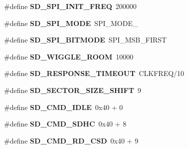 \begin{DoxyCompactItemize}
\item 
\hypertarget{group__sd__private_gaacd0a7a62e05b0aa518455408d15aed8}{\#define {\bfseries \-S\-D\-\_\-\-S\-P\-I\-\_\-\-I\-N\-I\-T\-\_\-\-F\-R\-E\-Q}~200000}\label{group__sd__private_gaacd0a7a62e05b0aa518455408d15aed8}

\item 
\hypertarget{group__sd__private_ga7de8609a5c3204fa153948023143dd15}{\#define {\bfseries \-S\-D\-\_\-\-S\-P\-I\-\_\-\-M\-O\-D\-E}~\-S\-P\-I\-\_\-\-M\-O\-D\-E\-\_}\label{group__sd__private_ga7de8609a5c3204fa153948023143dd15}

\item 
\hypertarget{group__sd__private_ga08df79ed6c60843ebe93df838a17e6e0}{\#define {\bfseries \-S\-D\-\_\-\-S\-P\-I\-\_\-\-B\-I\-T\-M\-O\-D\-E}~\-S\-P\-I\-\_\-\-M\-S\-B\-\_\-\-F\-I\-R\-S\-T}\label{group__sd__private_ga08df79ed6c60843ebe93df838a17e6e0}

\item 
\hypertarget{group__sd__private_gaf562806de24a960b3ae8c3fee4f0f040}{\#define {\bfseries \-S\-D\-\_\-\-W\-I\-G\-G\-L\-E\-\_\-\-R\-O\-O\-M}~10000}\label{group__sd__private_gaf562806de24a960b3ae8c3fee4f0f040}

\item 
\hypertarget{group__sd__private_ga9d03f3944a7a0d6ee960f0fd9d914873}{\#define {\bfseries \-S\-D\-\_\-\-R\-E\-S\-P\-O\-N\-S\-E\-\_\-\-T\-I\-M\-E\-O\-U\-T}~\-C\-L\-K\-F\-R\-E\-Q/10}\label{group__sd__private_ga9d03f3944a7a0d6ee960f0fd9d914873}

\item 
\hypertarget{group__sd__private_ga368e1bffb1441401e1ded6aa70f1c24e}{\#define {\bfseries \-S\-D\-\_\-\-S\-E\-C\-T\-O\-R\-\_\-\-S\-I\-Z\-E\-\_\-\-S\-H\-I\-F\-T}~9}\label{group__sd__private_ga368e1bffb1441401e1ded6aa70f1c24e}

\item 
\hypertarget{group__sd__private_ga76ae686c9ae7ae9c4e57b159922467cc}{\#define {\bfseries \-S\-D\-\_\-\-C\-M\-D\-\_\-\-I\-D\-L\-E}~0x40 + 0}\label{group__sd__private_ga76ae686c9ae7ae9c4e57b159922467cc}

\item 
\hypertarget{group__sd__private_gaaf2c4aded8b5d96a6825cb2ad883a30e}{\#define {\bfseries \-S\-D\-\_\-\-C\-M\-D\-\_\-\-S\-D\-H\-C}~0x40 + 8}\label{group__sd__private_gaaf2c4aded8b5d96a6825cb2ad883a30e}

\item 
\hypertarget{group__sd__private_ga7d506a35d3180c1b68691838aec5eed6}{\#define {\bfseries \-S\-D\-\_\-\-C\-M\-D\-\_\-\-R\-D\-\_\-\-C\-S\-D}~0x40 + 9}\label{group__sd__private_ga7d506a35d3180c1b68691838aec5eed6}


\end{DoxyCompactItemize}
